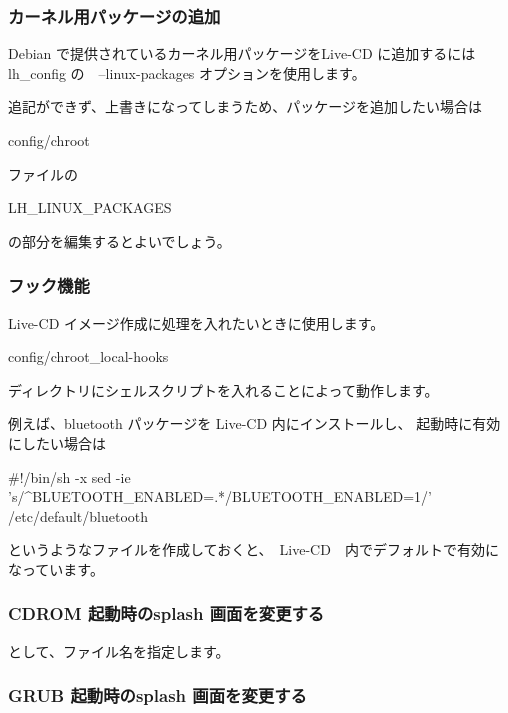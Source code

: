 \documentclass[mingoth,a4paper]{jsarticle}
\begin{document}
\subsubsection{カーネル用パッケージの追加}

Debian で提供されているカーネル用パッケージをLive-CD に追加するには
lh\_config の　--linux-packages オプションを使用します。
\begin{commandline}
\end{commandline}

追記ができず、上書きになってしまうため、パッケージを追加したい場合は
\begin{commandline}
config/chroot
\end{commandline}
ファイルの
\begin{commandline}
LH_LINUX_PACKAGES
\end{commandline}
の部分を編集するとよいでしょう。

\subsubsection{フック機能}
Live-CD イメージ作成に処理を入れたいときに使用します。

\begin{commandline}
config/chroot_local-hooks
\end{commandline}
ディレクトリにシェルスクリプトを入れることによって動作します。

例えば、bluetooth パッケージを Live-CD 内にインストールし、
起動時に有効にしたい場合は

\begin{commandline}
#!/bin/sh -x
sed -ie 's/^BLUETOOTH_ENABLED=.*/BLUETOOTH_ENABLED=1/' /etc/default/bluetooth
\end{commandline}
というようなファイルを作成しておくと、　Live-CD　内でデフォルトで有効になっています。

\subsubsection{CDROM 起動時のsplash 画面を変更する}

\begin{commandline}
\end{commandline}
として、ファイル名を指定します。

\subsubsection{GRUB 起動時のsplash 画面を変更する}
\end{document}
